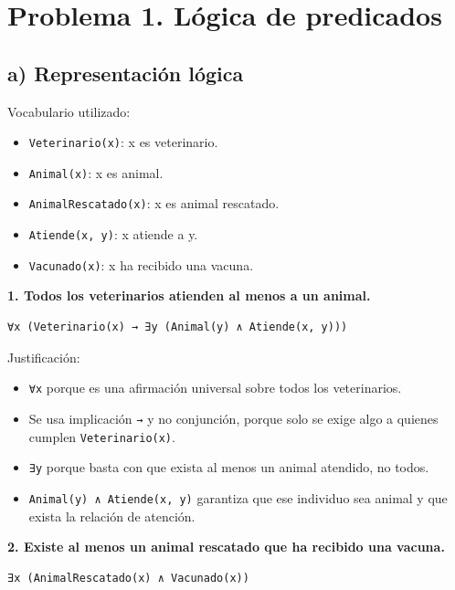 \section{Problema 1. Lógica de
predicados}\label{problema-1.-luxf3gica-de-predicados}

\subsection{a) Representación
lógica}\label{a-representaciuxf3n-luxf3gica}

Vocabulario utilizado:

\begin{itemize}
\tightlist
\item
  \texttt{Veterinario(x)}: x es veterinario.
\item
  \texttt{Animal(x)}: x es animal.
\item
  \texttt{AnimalRescatado(x)}: x es animal rescatado.
\item
  \texttt{Atiende(x,\ y)}: x atiende a y.
\item
  \texttt{Vacunado(x)}: x ha recibido una vacuna.
\end{itemize}

\textbf{1. Todos los veterinarios atienden al menos a un animal.}

\begin{verbatim}
∀x (Veterinario(x) → ∃y (Animal(y) ∧ Atiende(x, y)))
\end{verbatim}

Justificación:

\begin{itemize}
\tightlist
\item
  \texttt{∀x} porque es una afirmación universal sobre todos los
  veterinarios.
\item
  Se usa implicación \texttt{→} y no conjunción, porque solo se exige
  algo a quienes cumplen \texttt{Veterinario(x)}.
\item
  \texttt{∃y} porque basta con que exista al menos un animal atendido,
  no todos.
\item
  \texttt{Animal(y)\ ∧\ Atiende(x,\ y)} garantiza que ese individuo sea
  animal y que exista la relación de atención.
\end{itemize}

\textbf{2. Existe al menos un animal rescatado que ha recibido una
vacuna.}

\begin{verbatim}
∃x (AnimalRescatado(x) ∧ Vacunado(x))
\end{verbatim}

